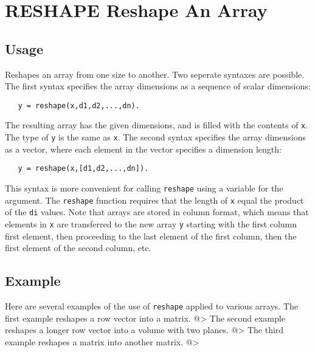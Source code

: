 \section{RESHAPE Reshape An Array}

\subsection{Usage}

Reshapes an array from one size to another. Two seperate 
syntaxes are possible.  The first syntax specifies the array 
dimensions as a sequence of scalar dimensions:
\begin{verbatim}
   y = reshape(x,d1,d2,...,dn).
\end{verbatim}
The resulting array has the given dimensions, and is filled with
the contents of \verb|x|.  The type of \verb|y| is the same as \verb|x|.  
The second syntax specifies the array dimensions as a vector,
where each element in the vector specifies a dimension length:
\begin{verbatim}
   y = reshape(x,[d1,d2,...,dn]).
\end{verbatim}
This syntax is more convenient for calling \verb|reshape| using a 
variable for the argument. The
\verb|reshape| function requires that the length of \verb|x| equal the product
of the \verb|di| values.
Note that arrays are stored in column format, 
which means that elements in \verb|x| are transferred to the new array
\verb|y| starting with the first column first element, then proceeding to 
the last element of the first column, then the first element of the
second column, etc.
\subsection{Example}

Here are several examples of the use of \verb|reshape| applied to
various arrays.  The first example reshapes a row vector into a 
matrix.
@>
The second example reshapes a longer row vector into a volume with 
two planes.
@>
The third example reshapes a matrix into another matrix.
@>
